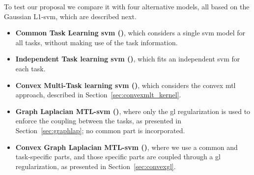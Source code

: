 To test our proposal we compare it with four alternative models, all based on the Gaussian L1-\acrshort{svm}, which are described next.
%
\begin{itemize}
    \item \textbf{Common Task Learning \acrshort{svm} ()}, which considers a single \acrshort{svm} model for all tasks, without making use of the task information.
    \item \textbf{Independent Task learning \acrshort{svm} ()}, which fits an independent \acrshort{svm} for each task.
    \item \textbf{Convex Multi-Task learning \acrshort{svm} ()}, which considers the convex \acrshort{mtl} approach, described in Section~\ref{sec:convexmlt_kernel}.
    \item \textbf{Graph Laplacian MTL-\acrshort{svm} ()}, where only the \acrshort{gl} regularization is used to enforce the coupling between the tasks, as presented in Section~\ref{sec:graphlap}; no common part is incorporated.
    \item \textbf{Convex Graph Laplacian MTL-\acrshort{svm} ()}, where we use a common and task-specific parts, and those specific parts are coupled through a \acrshort{gl} regularization, as presented in Section~\ref{sec:convexgl}.
\end{itemize}



